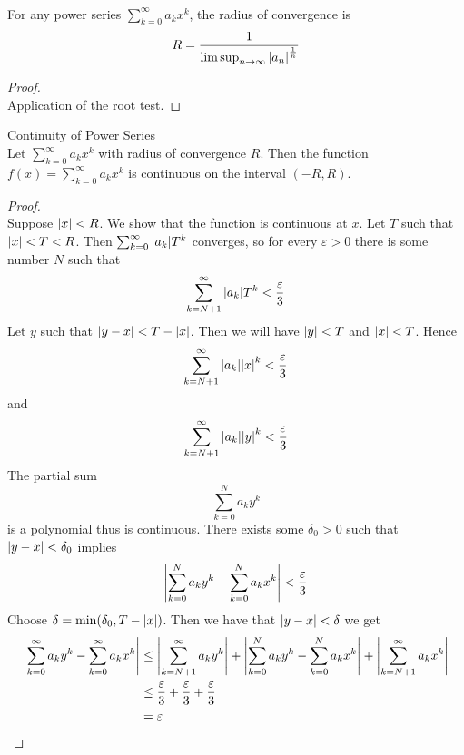 \documentclass[a4paper]{article}
\begin{document}
\begin{thm}{}{}\\ For any power series $\sum_{k=0}^\infty a_kx^k$, the radius of convergence is $$R=\frac{1}{\limsup_{n\to\infty}\abs{a_n}^{\frac{1}{n}}}$$ 
\begin{proof}\\ Application of the root test. 
\end{proof}
\end{thm}

\begin{thm}{Continuity of Power Series}{}\\ Let $\sum_{k=0}^{\infty}a_kx^k$ with radius of convergence $R$. Then the function $f(x)=\sum_{k=0}^{\infty}a_kx^k$ is continuous on the interval $(-R,R)$. 
\begin{proof}\\ Suppose $\abs{x}<R$. We show that the function is continuous at $x$. Let $T$ such that $\abs{x}<T<R$. Then $\sum_{k=0}^\infty\abs{a_k}T^k$ converges, so for every $\varepsilon>0$ there is some number $N$ such that $$\sum_{k=N+1}^\infty\abs{a_k}T^k<\frac{\varepsilon}{3}$$ Let $y$ such that $\abs{y-x}<T-\abs{x}$. Then we will have $\abs{y}<T$ and $\abs{x}<T$. Hence $$\sum_{k=N+1}^\infty\abs{a_k}\abs{x}^k<\frac{\varepsilon}{3}$$ and $$\sum_{k=N+1}^\infty\abs{a_k}\abs{y}^k<\frac{\varepsilon}{3}$$ The partial sum $$\sum_{k=0}^Na_ky^k$$ is a polynomial thus is continuous. There exists some $\delta_0>0$ such that $\abs{y-x}<\delta_0$ implies $$\abs{\sum_{k=0}^Na_ky^k-\sum_{k=0}^Na_kx^k}<\frac{\varepsilon}{3}$$ Choose $\delta=\min(\delta_0,T-\abs{x})$. Then we have that $\abs{y-x}<\delta$ we get 
\begin{align*}
\abs{\sum_{k=0}^\infty a_ky^k-\sum_{k=0}^\infty a_kx^k}&\leq\abs{\sum_{k=N+1}^\infty a_ky^k}+\abs{\sum_{k=0}^Na_ky^k-\sum_{k=0}^Na_kx^k}+\abs{\sum_{k=N+1}^\infty a_kx^k}\\
&\leq\frac{\varepsilon}{3}+\frac{\varepsilon}{3}+\frac{\varepsilon}{3}\\
&=\varepsilon
\end{align*}
\end{proof}
\end{thm}
\end{document}

